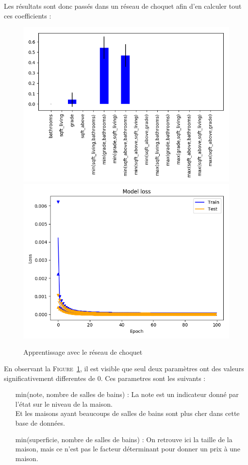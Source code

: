 Les résultats sont donc passés dans un réseau de choquet afin d'en calculer tout ces coefficients :
\begin{figure}[H]
    \center
    \includegraphics[height=\moyen]{pict/real/netch.png}
    \includegraphics[height=\petit]{pict/real/learnch.png}
	\caption{Apprentissage avec le réseau de choquet}
	\label{fig:real-choquet}
\end{figure}

En observant la \textsc{Figure}\ \ref{fig:real-choquet}, il est visible que seul deux paramètres
ont des valeurs significativement differentes de $0$.
Ces parametres sont les suivants :
\begin{itemize}
    \item[min(note, nombre de salles de bains) :] La note est un indicateur donné par l'état sur le niveau de la maison.\\
        Et les maisons ayant beaucoups de salles de bains sont plus cher dans cette base de données.
    \item[min(superficie, nombre de salles de bains) :] On retrouve ici la taille de la maison,
        mais ce n'est pas le facteur déterminant pour donner un prix à une maison.
\end{itemize}


